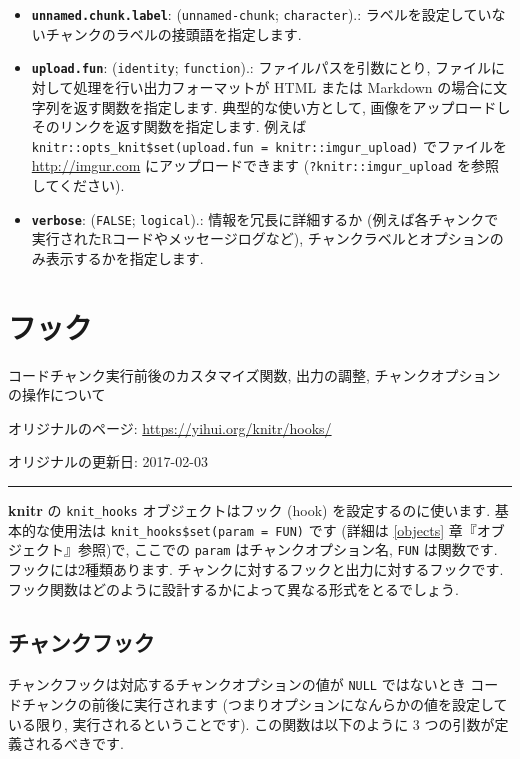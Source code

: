 \documentclass[
  xelatex,ja=standard,jafont=noto]{bxjsreport}
\begin{document}
\begin{itemize}
\item
  \textbf{\texttt{unnamed.chunk.label}}: (\texttt{unnamed-chunk};
  \texttt{character}).:
  ラベルを設定していないチャンクのラベルの接頭語を指定します.
\item
  \textbf{\texttt{upload.fun}}: (\texttt{identity}; \texttt{function}).:
  ファイルパスを引数にとり, ファイルに対して処理を行い出力フォーマットが
  HTML または Markdown の場合に文字列を返す関数を指定します.
  典型的な使い方として,
  画像をアップロードしそのリンクを返す関数を指定します. 例えば
  \texttt{knitr::opts\_knit\$set(upload.fun\ =\ knitr::imgur\_upload)}
  でファイルを \url{http://imgur.com} にアップロードできます
  (\texttt{?knitr::imgur\_upload} を参照してください).
\item
  \textbf{\texttt{verbose}}: (\texttt{FALSE}; \texttt{logical}).:
  情報を冗長に詳細するか
  (例えば各チャンクで実行されたRコードやメッセージログなど),
  チャンクラベルとオプションのみ表示するかを指定します.
\end{itemize}

\hypertarget{hooks}{%
\chapter{フック}\label{hooks}}

コードチャンク実行前後のカスタマイズ関数, 出力の調整,
チャンクオプションの操作について

オリジナルのページ: \url{https://yihui.org/knitr/hooks/}

オリジナルの更新日: 2017-02-03

\begin{center}\rule{0.5\linewidth}{0.5pt}\end{center}

\textbf{knitr} の \texttt{knit\_hooks} オブジェクトはフック (hook)
を設定するのに使います. 基本的な使用法は
\texttt{knit\_hooks\$set(param\ =\ FUN)} です (詳細は \ref{objects}
章『オブジェクト』参照)で, ここでの \texttt{param}
はチャンクオプション名, \texttt{FUN} は関数です.
フックには2種類あります. チャンクに対するフックと出力に対するフックです.
フック関数はどのように設計するかによって異なる形式をとるでしょう.

\hypertarget{ux30c1ux30e3ux30f3ux30afux30d5ux30c3ux30af}{%
\section{チャンクフック}\label{ux30c1ux30e3ux30f3ux30afux30d5ux30c3ux30af}}

チャンクフックは対応するチャンクオプションの値が \texttt{NULL}
ではないとき コードチャンクの前後に実行されます
(つまりオプションになんらかの値を設定している限り,
実行されるということです). この関数は以下のように 3
つの引数が定義されるべきです.
\end{document}
